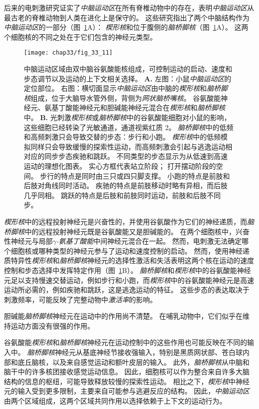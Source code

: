 后来的电刺激研究证实了\textit{中脑运动区}在所有脊椎动物中的存在，表明\textit{中脑运动区}从最古老的脊椎动物到人类在进化上是保守的。
这些研究指出了两个中脑结构作为\textit{中脑运动区}的一部分（图~\ref{fig:33_11}A）：
\textit{楔形核}和位于腹侧的\textit{脑桥脚核}（图~\ref{fig:33_11}A）。
这两个细胞核的不同之处在于它们包含的神经元类型。


\begin{figure}[htbp]
	\centering
	\texttt{[image: chap33/fig\_33\_11]}
	\caption{中脑运动区域由双中脑谷氨酸能核组成，可控制运动的启动、速度和步态调节以及运动的上下文相关选择。
		\textbf{A.} 左图：小鼠\textit{中脑运动区}的定位部位。
		右图：横切面显示\textit{中脑运动区}由中脑的\textit{楔形核}和\textit{脑桥脚核}组成，位于大脑导水管外侧，背侧为\textit{网状脑桥嘴核}。
		谷氨酸能神经元、氨基丁酸能神经元和胆碱能神经元混合在\textit{楔形核}和\textit{脑桥脚核}中。
		\textbf{B.} 光刺激\textit{楔形核}或\textit{脑桥脚核}中的谷氨酸能细胞对小鼠的影响，这些细胞已经转染了光敏通道，通道视紫红质 2。
		\textit{脑桥脚核}中的低频和高频刺激只会导致交替的步态：步行和小跑。
		\textit{楔形核}中的低频模拟同样只会导致缓慢的探索性运动，而高频刺激会引起与逃逸运动相对应的同步步态疾驰和跳跃。
		不同类型的步态显示为从低速到高速运动的理想化图表。
		实心方框代表站立阶段；
		打开摆动阶段的空间。
		步行的特点是同时由三只或四只脚支撑。
		小跑的特点是前肢和后肢对角线同时活动。
		疾驰的特点是前肢移动时略有异相，而后肢几乎同相。
		跳跃的特点是后肢和前肢同时运动，前肢和后肢不同步\cite{caggiano2018midbrain}。}
	\label{fig:33_11}
\end{figure}


\textit{楔形核}中的远程投射神经元是兴奋性的，并使用谷氨酸作为它们的神经递质，而\textit{脑桥脚核}中的远程投射神经元既是谷氨酸能又是胆碱能的。
在两个细胞核中，兴奋性神经元与局部\textit{$\gamma$-氨基丁酸能}中间神经元混合在一起。
然而，电刺激无法确定哪个细胞核或哪种类型的神经元参与了运动和速度控制的启动。
然而，使用神经递质特异性\textit{楔形核}和\textit{脑桥脚核}神经元的选择性激活和失活表明这两个核在运动的速度控制和步态选择中发挥特定作用（图~\ref{fig:33_11}B）。
\textit{脑桥脚核}和\textit{楔形核}中的谷氨酸能神经元足以支持慢速交替运动，例如步行和小跑，而\textit{楔形核}中的谷氨酸能神经元是高速运动所必需的，例如疾驰和跳跃，这是逃逸运动的特征。
这些步态的表达取决于刺激频率，可能反映了完整动物中\textit{激活率}的影响。


胆碱能\textit{脑桥脚核}神经元在运动中的作用尚不清楚。
在哺乳动物中，它们似乎在维持运动方面没有很强的作用。


谷氨酸能\textit{楔形核}和\textit{脑桥脚核}神经元在运动控制中的这些作用也可能反映在不同的输入中。
\textit{脑桥脚核}神经元从基底神经节接收强输入，特别是黑质网状部、苍白球内部和底丘脑核，以及来自感觉运动和额叶皮层的输入。
此外，\textit{脑桥脚核}从中脑和脑干中的许多核团接收感觉运动信息。
因此，细胞核可以作为整合来自许多大脑结构的信息的枢纽，可能导致释放较慢的探索性运动。
相比之下，\textit{楔形核}中神经元的输入受到更多限制，主要来自可能参与逃避反应的结构。
因此，\textit{中脑运动区}由两个区域组成，这两个区域共同作用以选择依赖于上下文的运动行为。


